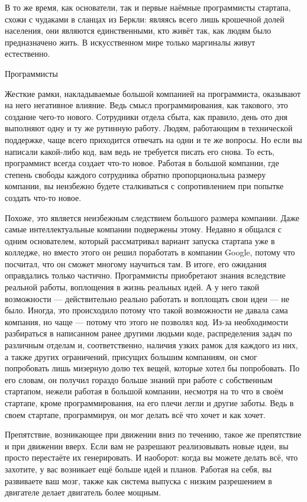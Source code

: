 \documentclass[ebook,12pt,oneside,openany]{memoir}
\begin{document}
В то же время, как основатели, так и первые наёмные программисты
стартапа, схожи с чудаками в сланцах из Беркли: являясь всего лишь
крошечной долей населения, они являются единственными, кто живёт так,
как людям было предназначено жить. В искусственном мире только
маргиналы живут естественно.

Программисты

Жесткие рамки, накладываемые большой компанией на программиста,
оказывают на него негативное влияние. Ведь смысл программирования, как
такового, это создание чего-то нового. Сотрудники отдела сбыта, как
правило, день ото дня выполняют одну и ту же рутинную работу. Людям,
работающим в технической поддержке, чаще всего приходится отвечать на
одни и те же вопросы. Но если вы написали какой-либо код, вам ведь не
требуется писать его снова. То есть, программист всегда создает что-то
новое. Работая в большой компании, где степень свободы каждого
сотрудника обратно пропорциональна размеру компании, вы неизбежно
будете сталкиваться с сопротивлением при попытке создать что-то новое.

Похоже, это является неизбежным следствием большого размера компании.
Даже самые интеллектуальные компании подвержены этому. Недавно я
общался с одним основателем, который рассматривал вариант запуска
стартапа уже в колледже, но вместо этого он решил поработать в
компании Google, потому что посчитал, что он сможет многому научиться
там. В итоге, его ожидания оправдались только частично. Программисты
приобретают знания вследствие реальной работы, воплощения в жизнь
реальных идей. А у него такой возможности — действительно реально
работать и воплощать свои идеи — не было. Иногда, это происходило
потому что такой возможности не давала сама компания, но чаще — потому
что этого не позволял код. Из-за необходимости разбираться в
написанном ранее другими людьми коде, распределения задач по различным
отделам и, соответственно, наличия узких рамок для каждого из них, а
также других ограничений, присущих большим компаниям, он смог
попробовать лишь мизерную долю тех вещей, которые хотел бы
попробовать. По его словам, он получил гораздо больше знаний при
работе с собственным стартапом, нежели работая в большой компании,
несмотря на то что в своём стартапе, кроме программирования, на его
плечи легли и другие заботы. Ведь в своем стартапе, программируя, он
мог делать всё что хочет и как хочет.

{{Препятствие, возникающее при движении вниз по течению, такое же
    препятствие и при движении вверх.}} Если вам не разрешают
реализовывать новые идеи, вы просто перестаёте их генерировать. И
наоборот: когда вы можете делать всё, что захотите, у вас возникает
ещё больше идей и планов. Работая на себя, вы развиваете ваш мозг,
также как система выпуска с низким разрешением в двигателе делает
двигатель более мощным.
\end{document}
